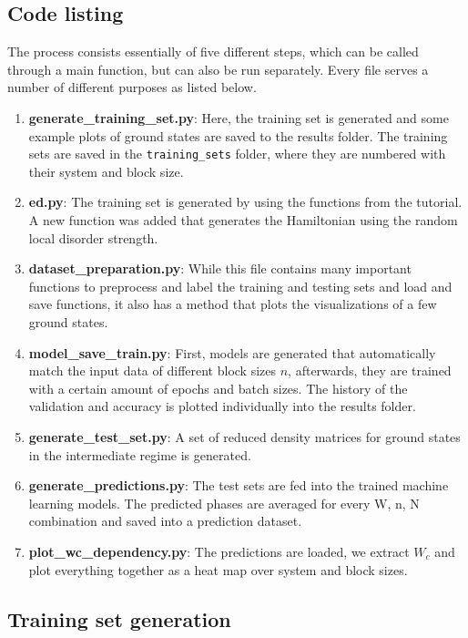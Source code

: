 \documentclass[reprint,amsmath,amssymb,aps,prb]{revtex4-2}
\begin{document}
\begin{widetext}
\section{Code listing} \label{app:codes}
The process consists essentially of five different steps, which can be called through a main function, but can also be run separately. Every file serves a number of different purposes as listed below.%

\begin{enumerate}
	\item \textbf{generate\_training\_set.py}: Here, the training set is generated and some example plots of ground states are saved to the results folder. The training sets are saved in the \texttt{training\_sets} folder, where they are numbered with their system and block size.
	\item \textbf{ed.py}: The training set is generated by using the functions from the tutorial. A new function was added that generates the Hamiltonian using the random local disorder strength.
	\item \textbf{dataset\_preparation.py}: While this file contains many important functions to preprocess and label the training and testing sets and load and save functions, it also has a method that plots the visualizations of a few ground states.
	\item \textbf{model\_save\_train.py}: First, models are generated that automatically match the input data of different block sizes $n$, afterwards, they are trained with a certain amount of epochs and batch sizes. The history of the validation and accuracy is plotted individually into the results folder.
	\item \textbf{generate\_test\_set.py}: A set of reduced density matrices for ground states in the intermediate regime is generated.
	\item \textbf{generate\_predictions.py}: The test sets are fed into the trained machine learning models. The predicted phases are averaged for every W, n, N combination and saved into a prediction dataset.
	\item \textbf{plot\_wc\_dependency.py}: The predictions are loaded, we extract $W_c$ and plot everything together as a heat map over system and block sizes.
\end{enumerate}

\subsection{Training set generation}



\end{widetext}
\end{document}
